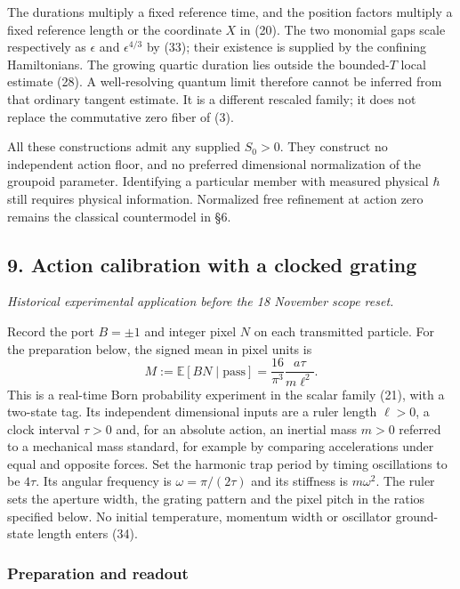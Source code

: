 \documentclass[11pt,a4paper]{article}
\begin{document}
The durations multiply a fixed reference time, and the position factors
multiply a fixed reference length or the coordinate \(X\) in (20). The
two monomial gaps scale respectively as \(\epsilon\) and
\(\epsilon^{4/3}\) by (33); their existence is supplied by the confining
Hamiltonians. The growing quartic duration lies outside the
bounded-\(T\) local estimate (28). A well-resolving quantum limit
therefore cannot be inferred from that ordinary tangent estimate. It is
a different rescaled family; it does not replace the commutative zero
fiber of (3).

All these constructions admit any supplied \(S_0>0\). They construct no
independent action floor, and no preferred dimensional normalization of
the groupoid parameter. Identifying a particular member with measured
physical \(\hbar\) still requires physical information. Normalized free
refinement at action zero remains the classical countermodel in §6.

\subsection{9. Action calibration with a clocked
grating}\label{action-calibration-with-a-clocked-grating}

\emph{Historical experimental application before the 18 November scope
reset.}

\protect{}\label{9-action-calibration-with-a-clocked-grating}{}

Record the port \(B=\pm1\) and integer pixel \(N\) on each transmitted
particle. For the preparation below, the signed mean in pixel units is
\[
 M:=\mathbb E[BN\mid\mathrm{pass}]
     =\frac{16}{\pi^3}\frac{a\tau}{m\ell^2}.
 \tag{34}
\] This is a real-time Born probability experiment in the scalar family
(21), with a two-state tag. Its independent dimensional inputs are a
ruler length \(\ell>0\), a clock interval \(\tau>0\) and, for an
absolute action, an inertial mass \(m>0\) referred to a mechanical mass
standard, for example by comparing accelerations under equal and
opposite forces. Set the harmonic trap period by timing oscillations to
be \(4\tau\). Its angular frequency is \(\omega=\pi/(2\tau)\) and its
stiffness is \(m\omega^2\). The ruler sets the aperture width, the
grating pattern and the pixel pitch in the ratios specified below. No
initial temperature, momentum width or oscillator ground-state length
enters (34).

\subsubsection{Preparation and readout}\label{preparation-and-readout}
\end{document}
